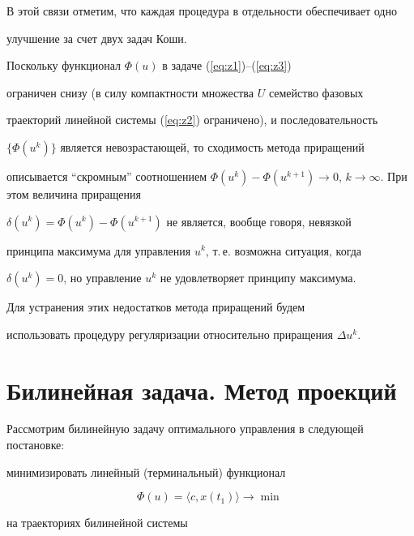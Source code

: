 В этой связи отметим, что каждая процедура в отдельности обеспечивает одно


улучшение за счет двух задач Коши.





Поскольку функционал $\Phi(u)$ в задаче (\ref{eq:z1})--(\ref{eq:z3})


ограничен снизу (в силу компактности множества $U$ семейство фазовых


траекторий линейной системы (\ref{eq:z2}) ограничено), и последовательность


$\{\Phi(u^k)\}$ является невозрастающей, то сходимость метода приращений


описывается ``скромным'' соотношением $\Phi(u^k)-\Phi(u^{k+1})\to


0$, $k\to\infty$. При этом величина приращения


$\delta(u^k)=\Phi(u^k)-\Phi(u^{k+1})$ не является, вообще говоря, невязкой


принципа максимума для управления $u^k$, т.\,е. возможна ситуация, когда


$\delta(u^k)=0$, но управление $u^k$ не удовлетворяет принципу максимума.


Для устранения этих недостатков метода приращений будем


использовать процедуру регуляризации относительно приращения $\Delta u^k$.





\section {Билинейная задача. Метод проекций }





Рассмотрим билинейную задачу оптимального управления в следующей постановке:





минимизировать линейный (терминальный) функционал


\begin{equation}


\Phi(u)=\langle c,x(t_1)\rangle \to\min\,


\label{eq:z19}


\end{equation}


на траекториях билинейной системы



